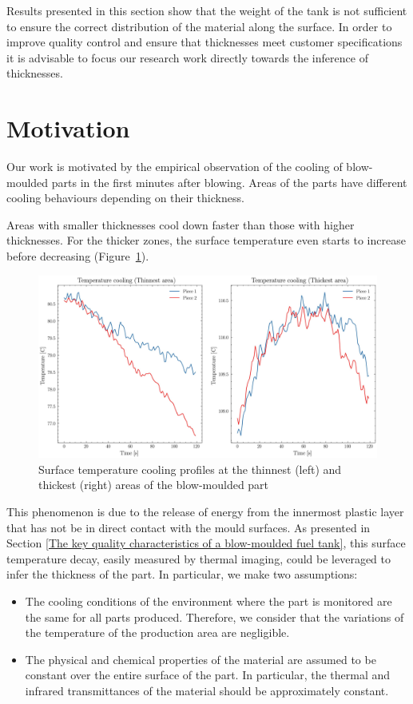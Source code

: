 %
Results presented in this section show that the weight of the tank is not sufficient to ensure the correct distribution of the material along the surface. In order to improve quality control and ensure that thicknesses meet customer specifications it is advisable to focus our research work directly towards the inference of thicknesses.

\section{Motivation} \label{Motivation}

Our work is motivated by the empirical observation of the cooling of blow-moulded parts in the first minutes after blowing. Areas of the parts have different cooling behaviours depending on their thickness. 

Areas with smaller thicknesses cool down faster than those with higher thicknesses. For the thicker zones, the surface temperature even starts to increase before decreasing (Figure~\ref{fig:temperature_cooling}).
%
\begin{figure}
\centering
\includegraphics[scale=0.55]{images/chapter_4/cooling.eps}
\caption{Surface temperature cooling profiles at the thinnest (left) and thickest (right) areas of the blow-moulded part}
\label{fig:temperature_cooling}
\end{figure}
%
This phenomenon is due to the release of energy from the innermost plastic layer that has not be in direct contact with the mould surfaces.
As presented in Section \ref{The key quality characteristics of a blow-moulded fuel tank}, this surface temperature decay, easily measured by thermal imaging, could be leveraged to infer the thickness of the part.  
In particular, we make two assumptions:
\begin{itemize}
   \item The cooling conditions of the environment where the part is monitored are the same for all parts produced. Therefore, we consider that the variations of the temperature of the production area are negligible.
   \item The physical and chemical properties of the material are assumed to be constant over the entire surface of the part. In particular, the thermal and infrared transmittances of the material should be approximately constant.
\end{itemize}

